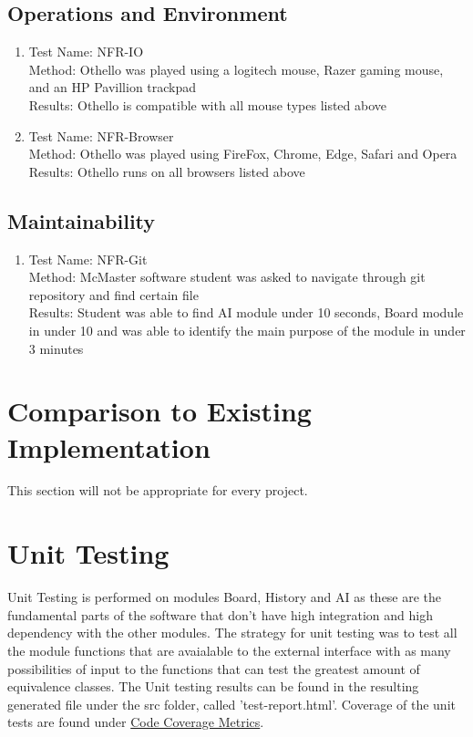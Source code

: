 \documentclass[12pt, titlepage]{article}
\begin{document}
\subsection{Operations and Environment}
\begin{enumerate}
	\item Test Name: NFR-IO\\
	      Method: Othello was played using a logitech mouse, Razer gaming mouse, and an HP Pavillion trackpad\\
	      Results: Othello is compatible with all mouse types listed above
	\item Test Name: NFR-Browser\\
	      Method: Othello was played using FireFox, Chrome, Edge, Safari and Opera\\
	      Results: Othello runs on all browsers listed above
\end{enumerate}


\subsection{Maintainability}
\begin{enumerate}
	\item Test Name: NFR-Git\\
	      Method: McMaster software student was asked to navigate through git repository and find certain file\\
	      Results: Student was able to find AI module under 10 seconds, Board module in under 10 and was able to identify the main purpose of the module in under 3 minutes
\end{enumerate}

\section{Comparison to Existing Implementation}

This section will not be appropriate for every project.

\section{Unit Testing}
\label{sec:ut}
\hypertarget{sec:ccm}{}

Unit Testing is performed on modules Board, History and AI as these are the fundamental parts of the software that don't have high integration and high dependency with the other modules. The strategy for unit testing was to test all the module functions that are avaialable to the external interface with as many possibilities of input to the functions that can test the greatest amount of equivalence classes. The Unit testing results can be found in the resulting generated file under the src folder, called 'test-report.html'. Coverage of the unit tests are found under \hyperref[sec:ccm]{Code Coverage Metrics}.
\end{document}
